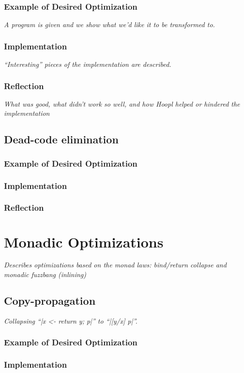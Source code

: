\documentclass[12pt]{report}
\begin{document}
\subsection{Example of Desired Optimization}
\emph{A program is given and we show what we'd like it to be
transformed to.}

\subsection{Implementation}
\emph{``Interesting'' pieces of the implementation are described.}

\subsection{Reflection}
\emph{What was good, what didn't work so well, and how Hoopl helped
or hindered the implementation}

\section{Dead-code elimination}
\subsection{Example of Desired Optimization}
\subsection{Implementation}
\subsection{Reflection}

\chapter{Monadic Optimizations}
\emph{Describes optimizations based on the monad laws: bind/return collapse and
  monadic fuzzbang (inlining)}

\section{Copy-propagation}
\emph{Collapsing ``|x <- return y; p|'' to ``|[y/x] p|''.}
\subsection{Example of Desired Optimization}
\subsection{Implementation}
\end{document}
